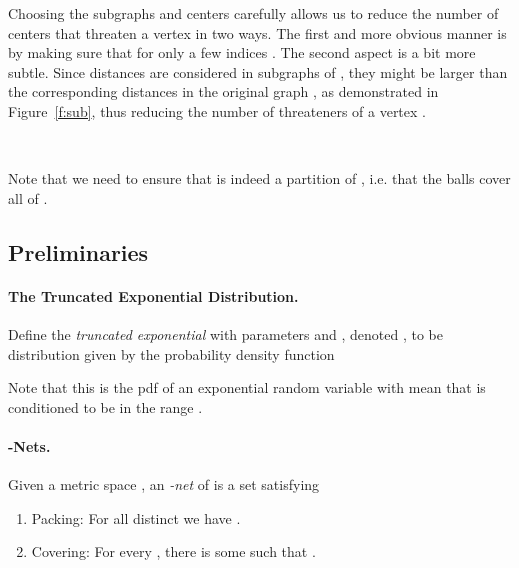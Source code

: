 \documentclass[11pt,fleqn]{article}
\begin{document}
Choosing the subgraphs and centers carefully allows us to reduce the number of centers that threaten a vertex  in two ways. The first and more obvious manner is by making sure that  for only a few indices . The second aspect is a bit more subtle. Since distances are considered in subgraphs of , they might be larger than the corresponding distances in the original graph , as demonstrated in Figure~\ref{f:sub}, thus reducing the number of threateners of a vertex .

\begin{figure*}[t]
  \begin{center}
     \hspace{3pc}
    \ 
  \end{center}
  \caption{When carving balls in a subgraph of , the number of threateners to a vertex is smaller.}
  \label{f:sub}
\end{figure*}


Note that we need to ensure that  is indeed a partition of , i.e. that the balls  cover all of .

\subsection{Preliminaries}
\paragraph{The Truncated Exponential Distribution.} Define the {\em truncated exponential} with parameters  and , 
denoted ,
to be distribution given by the probability density function 

Note that this is the pdf of an exponential random variable with mean  that is conditioned to be in the range .
\paragraph{-Nets.} Given a metric space , an {\em -net} of  is a set  satisfying
\begin{enumerate}
	\item Packing: For all distinct  we have .
	\item Covering: For every , there is some  such that .
\end{enumerate}
\end{document}
